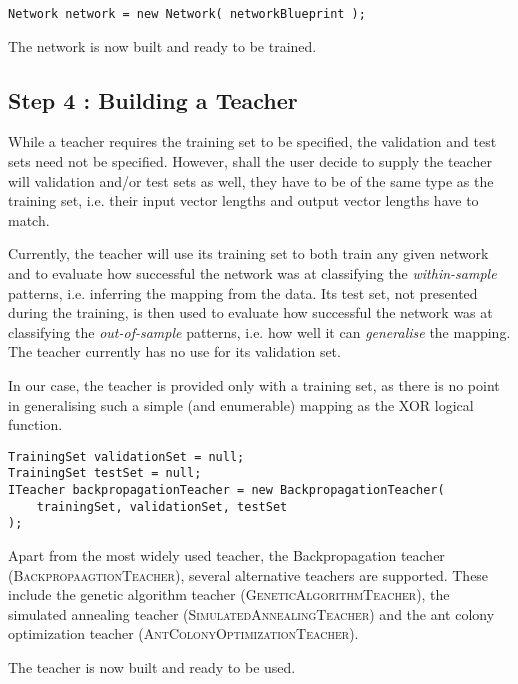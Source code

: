 \medskip

\begin{verbatim}
Network network = new Network( networkBlueprint );
\end{verbatim}

\medskip

The network is now built and ready to be trained.

\subsection{Step 4 : Building a Teacher}

While a teacher requires the training set to be specified, the validation and test sets need not be specified. However, shall the user decide to supply the teacher will validation and/or test sets as well, they have to be of the same type as the training set, i.e. their input vector lengths and output vector lengths have to match.

Currently, the teacher will use its training set to both train any given network and to evaluate how successful the network was at classifying the \textit{within-sample} patterns, i.e. inferring the mapping from the data. Its test set, not presented during the training, is then used to evaluate how successful the network was at classifying the \textit{out-of-sample} patterns, i.e. how well it can \textit{generalise} the mapping. The teacher currently has no use for its validation set.

In our case, the teacher is provided only with a training set, as there is no point in generalising such a simple (and enumerable) mapping as the XOR logical function.

\medskip

\begin{verbatim}
TrainingSet validationSet = null;
TrainingSet testSet = null;
ITeacher backpropagationTeacher = new BackpropagationTeacher(
    trainingSet, validationSet, testSet
);
\end{verbatim}

\medskip

Apart from the most widely used teacher, the Backpropagation teacher (\textsc{BackpropaagtionTeacher}), several alternative teachers are supported. These include the genetic algorithm teacher (\textsc{GeneticAlgorithmTeacher}), the simulated annealing teacher (\textsc{SimulatedAnnealingTeacher}) and the ant colony optimization teacher (\textsc{AntColonyOptimizationTeacher}).

The teacher is now built and ready to be used.

